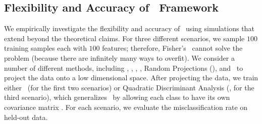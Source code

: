 \documentclass[11pt]{extarticle}
\begin{document}
\subsection*{Flexibility and Accuracy of \Lol~Framework}

We empirically investigate the flexibility and accuracy of \Lol~using simulations that extend beyond the theoretical claims.
For three different scenarios, we sample
$100$ training samples each with  $100$ features; therefore, Fisher's \Lda~cannot solve the problem (because there are infinitely many ways to overfit).
We consider a number of different methods, including 
\Pca, \Lda, \Pls, \Road, Random Projections (\Rp), and \Cca~to project the data onto a low dimensional space.
After projecting the data, we train either \Lda~(for the first two scenarios) or  Quadratic Discriminant Analysis (\Qda, for the third scenario), which generalizes \Lda~by allowing each class to have its own covariance matrix  \cite{Hastie2004}.
For each scenario, we evaluate the misclassification rate on held-out data.
\end{document}
